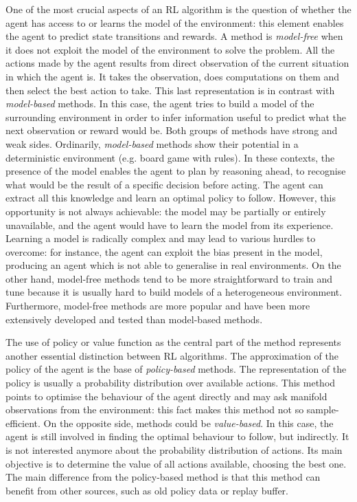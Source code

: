 One of the most crucial aspects of an RL algorithm is the question of whether the agent has access to or learns the model of the environment: this element enables the agent to predict state transitions and rewards.
A method is \textit{model-free} when it does not exploit the model of the environment to solve the problem. All the actions made by the agent results from direct observation of the current situation in which the agent is. It takes the observation, does computations on them and then select the best action to take.
This last representation is in contrast with \textit{model-based} methods. In this case, the agent tries to build a model of the surrounding environment in order to infer information useful to predict what the next observation or reward would be.
Both groups of methods have strong and weak sides.
Ordinarily, \textit{model-based} methods show their potential in a deterministic environment (e.g. board game with rules). In these contexts, the presence of the model enables the agent to plan by reasoning ahead, to recognise what would be the result of a specific decision before acting. The agent can extract all this knowledge and learn an optimal policy to follow. However, this opportunity is not always achievable: the model may be partially or entirely unavailable, and the agent would have to learn the model from its experience. Learning a model is radically complex and may lead to various hurdles to overcome: for instance, the agent can exploit the bias present in the model, producing an agent which is not able to generalise in real environments.
On the other hand, model-free methods tend to be more straightforward to train and tune because it is usually hard to build models of a heterogeneous environment. Furthermore, model-free methods are more popular and have been more extensively developed and tested than model-based methods.

The use of policy or value function as the central part of the method represents another essential distinction between RL algorithms.
The approximation of the policy of the agent is the base of \textit{policy-based} methods. The representation of the policy is usually a probability distribution over available actions. This method points to optimise the behaviour of the agent directly and may ask manifold observations from the environment: this fact makes this method not so sample-efficient.
On the opposite side, methods could be \textit{value-based}. In this case, the agent is still involved in finding the optimal behaviour to follow, but indirectly. It is not interested anymore about the probability distribution of actions. Its main objective is to determine the value of all actions available, choosing the best one. The main difference from the policy-based method is that this method can benefit from other sources, such as old policy data or replay buffer.

